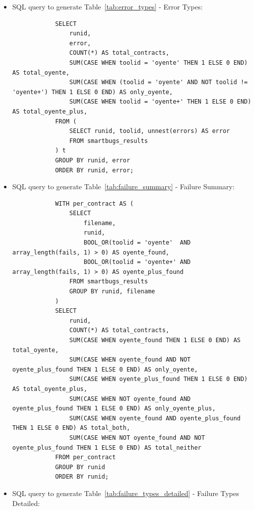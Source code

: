 \documentclass{article}
\begin{document}
\begin{itemize}
\begin{verbatim}
				GROUP BY runid, filename
			)
			SELECT
				runid,
				COUNT(*) AS total_contracts,
				SUM(CASE WHEN oyente_found THEN 1 ELSE 0 END) AS total_oyente,
				SUM(CASE WHEN oyente_found AND NOT oyente_plus_found THEN 1 ELSE 0 END) AS only_oyente,
				SUM(CASE WHEN oyente_plus_found THEN 1 ELSE 0 END) AS total_oyente_plus,
				SUM(CASE WHEN NOT oyente_found AND oyente_plus_found THEN 1 ELSE 0 END) AS only_oyente_plus,
				SUM(CASE WHEN oyente_found AND oyente_plus_found THEN 1 ELSE 0 END) AS total_both,
				SUM(CASE WHEN NOT oyente_found AND NOT oyente_plus_found THEN 1 ELSE 0 END) AS total_neither
			FROM per_contract
			GROUP BY runid
			ORDER BY runid;
		\end{verbatim}
		\item SQL query to generate Table~\ref{tab:error_types} - Error Types:
		\begin{verbatim}
			SELECT
				runid,
				error,
				COUNT(*) AS total_contracts,
				SUM(CASE WHEN toolid = 'oyente' THEN 1 ELSE 0 END) AS total_oyente,
				SUM(CASE WHEN (toolid = 'oyente' AND NOT toolid != 'oyente+') THEN 1 ELSE 0 END) AS only_oyente,
				SUM(CASE WHEN toolid = 'oyente+' THEN 1 ELSE 0 END) AS total_oyente_plus,
			FROM (
				SELECT runid, toolid, unnest(errors) AS error
				FROM smartbugs_results
			) t
			GROUP BY runid, error
			ORDER BY runid, error;
		\end{verbatim}
		\item SQL query to generate Table~\ref{tab:failure_summary} - Failure Summary:
		\begin{verbatim}
			WITH per_contract AS (
				SELECT
					filename,
					runid,
					BOOL_OR(toolid = 'oyente'  AND array_length(fails, 1) > 0) AS oyente_found,
					BOOL_OR(toolid = 'oyente+' AND array_length(fails, 1) > 0) AS oyente_plus_found
				FROM smartbugs_results
				GROUP BY runid, filename
			)
			SELECT
				runid,
				COUNT(*) AS total_contracts,
				SUM(CASE WHEN oyente_found THEN 1 ELSE 0 END) AS total_oyente,
				SUM(CASE WHEN oyente_found AND NOT oyente_plus_found THEN 1 ELSE 0 END) AS only_oyente,
				SUM(CASE WHEN oyente_plus_found THEN 1 ELSE 0 END) AS total_oyente_plus,
				SUM(CASE WHEN NOT oyente_found AND oyente_plus_found THEN 1 ELSE 0 END) AS only_oyente_plus,
				SUM(CASE WHEN oyente_found AND oyente_plus_found THEN 1 ELSE 0 END) AS total_both,
				SUM(CASE WHEN NOT oyente_found AND NOT oyente_plus_found THEN 1 ELSE 0 END) AS total_neither
			FROM per_contract
			GROUP BY runid
			ORDER BY runid;
		\end{verbatim}
		\item SQL query to generate Table~\ref{tab:failure_types_detailed} - Failure Types Detailed:

\end{itemize}
\end{document}
